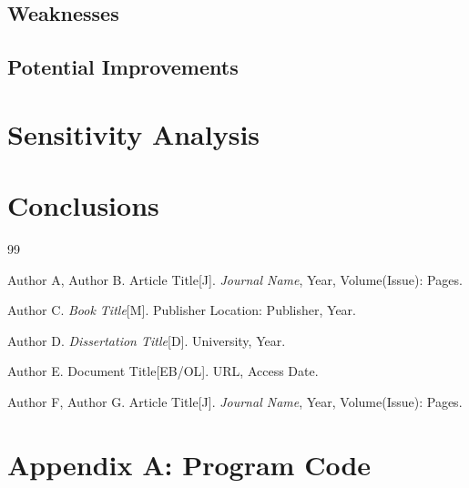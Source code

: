 \documentclass[12pt,a4paper]{article}
\begin{document}
\subsection{Weaknesses}
\subsection{Potential Improvements}

\section{Sensitivity Analysis}

\section{Conclusions}

\begin{thebibliography}{99}

 Author A, Author B. Article Title[J]. \textit{Journal Name}, Year, Volume(Issue): Pages.

 Author C. \textit{Book Title}[M]. Publisher Location: Publisher, Year.

 Author D. \textit{Dissertation Title}[D]. University, Year.

 Author E. Document Title[EB/OL]. URL, Access Date.

 Author F, Author G. Article Title[J]. \textit{Journal Name}, Year, Volume(Issue): Pages.

\end{thebibliography}

\newpage
\appendix
\section{Appendix A: Program Code}

\end{document}
